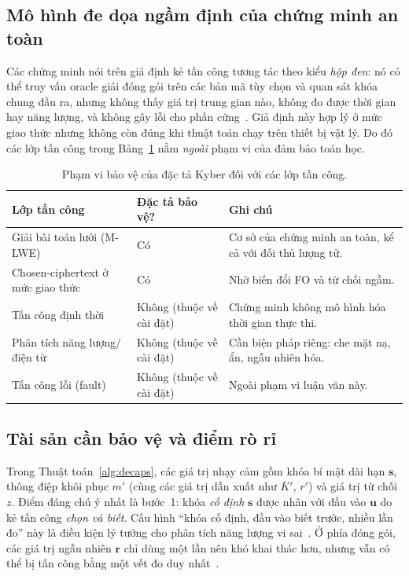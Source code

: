 \documentclass[../LuanVan.tex]{subfiles}
\begin{document}
\subsection{Mô hình đe dọa ngầm định của chứng minh an toàn}
 
Các chứng minh nói trên giả định kẻ tấn công tương tác theo kiểu \emph{hộp đen}: nó có thể truy vấn oracle giải đóng gói trên các bản mã tùy chọn và quan sát khóa chung đầu ra, nhưng không thấy giá trị trung gian nào, không đo được thời gian hay năng lượng, và không gây lỗi cho phần cứng~\cite{hhk2017}. Giả định này hợp lý ở mức giao thức nhưng không còn đúng khi thuật toán chạy trên thiết bị vật lý. Do đó các lớp tấn công trong Bảng~\ref{tab:scope} nằm \emph{ngoài} phạm vi của đảm bảo toán học.
 
\begin{table}[t]
\centering
\caption{Phạm vi bảo vệ của đặc tả Kyber đối với các lớp tấn công.}
\label{tab:scope}
\small
\begin{tabular}{@{}p{3.6cm}p{3.2cm}p{6.4cm}@{}}
\toprule
\textbf{Lớp tấn công} & \textbf{Đặc tả bảo vệ?} & \textbf{Ghi chú} \\
\midrule
Giải bài toán lưới (M-LWE) & Có & Cơ sở của chứng minh an toàn, kể cả với đối thủ lượng tử. \\
Chosen-ciphertext ở mức giao thức & Có & Nhờ biến đổi FO và từ chối ngầm. \\
Tấn công định thời & Không (thuộc về cài đặt) & Chứng minh không mô hình hóa thời gian thực thi. \\
Phân tích năng lượng/điện từ & Không (thuộc về cài đặt) & Cần biện pháp riêng: che mặt nạ, ẩn, ngẫu nhiên hóa. \\
Tấn công lỗi (fault) & Không (thuộc về cài đặt) & Ngoài phạm vi luận văn này. \\
\bottomrule
\end{tabular}
\end{table}
 
\subsection{Tài sản cần bảo vệ và điểm rò rỉ}
 
Trong Thuật toán~\ref{alg:decaps}, các giá trị nhạy cảm gồm khóa bí mật dài hạn $\mathbf{s}$, thông điệp khôi phục $m'$ (cùng các giá trị dẫn xuất như $\overline{K}'$, $r'$) và giá trị từ chối $z$. Điểm đáng chú ý nhất là bước~1: khóa \emph{cố định} $\mathbf{s}$ được nhân với đầu vào $\mathbf{u}$ do kẻ tấn công \emph{chọn và biết}. Cấu hình ``khóa cố định, đầu vào biết trước, nhiều lần đo'' này là điều kiện lý tưởng cho phân tích năng lượng vi sai~\cite{KocherJJ99,MangardOP07}. Ở phía đóng gói, các giá trị ngẫu nhiên $\mathbf{r}$ chỉ dùng một lần nên khó khai thác hơn, nhưng vẫn có thể bị tấn công bằng một vết đo duy nhất~\cite{Primas17}.
 
\end{document}
